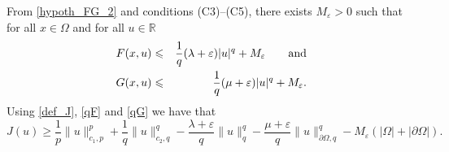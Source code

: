 \documentclass[pdflatex,sn-mathphys-num]{sn-jnl}
\theoremstyle{thmstyleone}%
\theoremstyle{thmstyletwo}%
\theoremstyle{thmstylethree}%
\theoremstyle{thmstylethree}%
\begin{document}
From \eqref{hypoth_FG_2}  and conditions (C3)--(C5),  there exists $M_{\varepsilon}>0 $ such that for all $x\in \Omega$ and for all $u\in \mathbb{R}$
    \begin{eqnarray}\label{qF}
        F(x,u) &\leqslant &\frac{1}{q}(\lambda + \varepsilon)|u|^q +{M}_\varepsilon \qquad \hbox{and}\\
        G(x,u) &\leqslant & \frac{1}{q}(\mu + \varepsilon )|u|^q+ M_{\varepsilon}.\label{qG}
    \end{eqnarray}
Using \eqref{def_J}, \eqref{qF}  and \eqref{qG} we have that
\begin{equation}\label{J_coerciv_1}
        J(u) \geqslant  \frac{1}{p}\|u\|_{c_1,p}^p+\frac{1}{q}\|u\|_{c_2,q}^q - \frac{\lambda+\varepsilon}{q} \|u\|_q^q- \frac{\mu+\varepsilon}{q}\|u\|_{\partial \Omega,q}^q - M_\varepsilon(|\Omega|+|\partial\Omega|).
    \end{equation}
\end{document}
